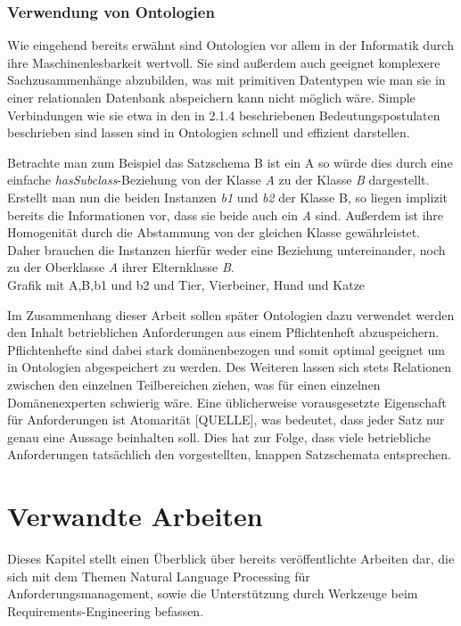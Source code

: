 \documentclass[12pt]{report}
\begin{document}
\subsubsection{Verwendung von Ontologien}
Wie eingehend bereits erwähnt sind Ontologien vor allem in der Informatik durch ihre Maschinenlesbarkeit wertvoll. Sie sind außerdem auch geeignet komplexere Sachzusammenhänge abzubilden, was mit primitiven Datentypen wie man sie in einer relationalen Datenbank abspeichern kann nicht möglich wäre. Simple Verbindungen wie sie etwa in den in 2.1.4 beschriebenen Bedeutungspostulaten beschrieben sind lassen sind in Ontologien schnell und effizient darstellen.

Betrachte man zum Beispiel das Satzschema \glqq B ist ein A\grqq{} so würde dies durch eine einfache \textit{hasSubclass}-Beziehung von der Klasse \textit{A} zu der Klasse \textit{B} dargestellt.
Erstellt man nun die beiden Instanzen \textit{b1} und \textit{b2} der Klasse B, so liegen implizit bereits die Informationen vor, dass sie beide auch ein \textit{A} sind. Außerdem ist ihre Homogenität durch die Abstammung von der gleichen Klasse gewährleistet. Daher brauchen die Instanzen hierfür weder eine Beziehung untereinander, noch zu der Oberklasse \textit{A} ihrer Elternklasse \textit{B}.
\\
\newline
Grafik mit A,B,b1 und b2 und Tier, Vierbeiner, Hund und Katze
\\
\newline

Im Zusammenhang dieser Arbeit sollen später Ontologien dazu verwendet werden den Inhalt betrieblichen Anforderungen aus einem Pflichtenheft abzuspeichern. Pflichtenhefte sind dabei stark domänenbezogen und somit optimal geeignet um in Ontologien abgespeichert zu werden. Des Weiteren lassen sich stets Relationen zwischen den einzelnen Teilbereichen ziehen, was für einen einzelnen Domänenexperten schwierig wäre. Eine üblicherweise vorausgesetzte Eigenschaft für Anforderungen ist Atomarität [QUELLE], was bedeutet, dass jeder Satz nur genau eine Aussage beinhalten soll. Dies hat zur Folge, dass viele betriebliche Anforderungen tatsächlich den vorgestellten, knappen Satzschemata entsprechen.

\section{Verwandte Arbeiten}
Dieses Kapitel stellt einen Überblick über bereits veröffentlichte Arbeiten dar, die sich mit dem Themen Natural Language Processing für Anforderungsmanagement, sowie die Unterstützung durch Werkzeuge beim Requirements-Engineering befassen. 
\end{document}
